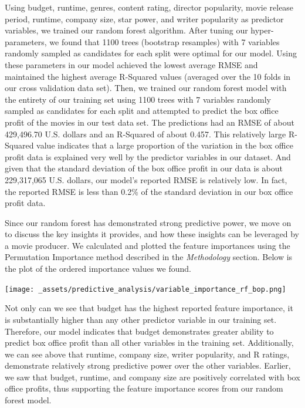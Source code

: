 \documentclass[10pt]{article}
\begin{document}
Using budget, runtime, genres, content rating, director popularity, movie release period, runtime, company size, star power, and writer popularity as predictor variables, we trained our random forest algorithm. After tuning our hyper-parameters, we found that 1100 trees (bootstrap resamples) with 7 variables randomly sampled as candidates for each split were optimal for our model. Using these parameters in our model achieved the lowest average RMSE and maintained the highest average R-Squared values (averaged over the 10 folds in our cross validation data set). Then, we trained our random forest model with the entirety of our training set using 1100 trees with 7 variables randomly sampled as candidates for each split and attempted to predict the box office profit of the movies in our test data set. The predictions had an RMSE of about 429,496.70 U.S. dollars and an R-Squared of about 0.457. This relatively large R-Squared value indicates that a large proportion of the variation in the box office profit data is explained very well by the predictor variables in our dataset. And given that the standard deviation of the box office profit in our data is about 229,317,065 U.S. dollars, our model’s reported RMSE is relatively low. In fact, the reported RMSE is less than 0.2\% of the standard deviation in our box office profit data.

Since our random forest has demonstrated strong predictive power, we move on to discuss the key insights it provides, and how these insights can be leveraged by a movie producer. We calculated and plotted the feature importances using the Permutation Importance method described in the \textit{Methodology} section. Below is the plot of the ordered importance values we found. 

\begin{center}
\texttt{[image: \_assets/predictive\_analysis/variable\_importance\_rf\_bop.png]}
\end{center}

Not only can we see that budget has the highest reported feature importance, it is substantially higher than any other predictor variable in our training set. Therefore, our model indicates that budget demonstrates greater ability to predict box office profit than all other variables in the training set. Additionally, we can see above that runtime, company size, writer popularity, and R ratings, demonstrate relatively strong predictive power over the other variables. Earlier, we saw that budget, runtime, and company size are positively correlated with box office profits, thus supporting the feature importance scores from our random forest model. 
\end{document}
